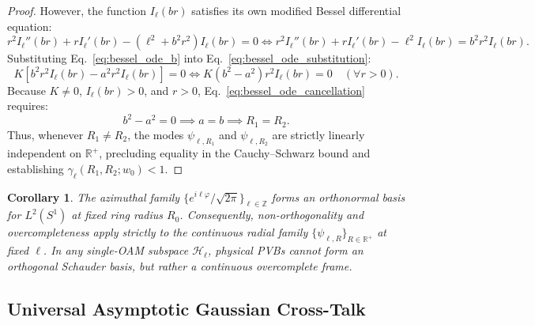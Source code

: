\documentclass[11pt,a4paper]{article}
\newtheorem{corollary}{Corollary}
\begin{document}
\begin{proof}
However, the function $I_\ell(b r)$ satisfies its own modified Bessel differential equation:
\begin{equation}
r^2 I_\ell''(b r) + r I_\ell'(b r) - (\ell^2 + b^2 r^2) I_\ell(b r) = 0 \iff r^2 I_\ell''(b r) + r I_\ell'(b r) - \ell^2 I_\ell(b r) = b^2 r^2 I_\ell(b r).
\label{eq:bessel_ode_b}
\end{equation}
Substituting Eq.~\eqref{eq:bessel_ode_b} into Eq.~\eqref{eq:bessel_ode_substitution}:
\begin{equation}
K \left[ b^2 r^2 I_\ell(b r) - a^2 r^2 I_\ell(b r) \right] = 0 \iff K (b^2 - a^2) r^2 I_\ell(b r) = 0 \quad (\forall r > 0).
\label{eq:bessel_ode_cancellation}
\end{equation}
Because $K \neq 0$, $I_\ell(b r) > 0$, and $r > 0$, Eq.~\eqref{eq:bessel_ode_cancellation} requires:
\begin{equation}
b^2 - a^2 = 0 \implies a = b \implies R_1 = R_2.
\label{eq:ode_conclusion}
\end{equation}
Thus, whenever $R_1 \neq R_2$, the modes $\psi_{\ell, R_1}$ and $\psi_{\ell, R_2}$ are strictly linearly independent on $\mathbb{R}^+$, precluding equality in the Cauchy--Schwarz bound and establishing $\gamma_\ell(R_1, R_2; w_0) < 1$.
\end{proof}

\begin{corollary}
The azimuthal family $\{e^{i\ell\varphi}/\sqrt{2\pi}\}_{\ell \in \mathbb{Z}}$ forms an orthonormal basis for $L^2(S^1)$ at fixed ring radius $R_0$. Consequently, non-orthogonality and overcompleteness apply strictly to the continuous radial family $\{\psi_{\ell, R}\}_{R \in \mathbb{R}^+}$ at fixed $\ell$. In any single-OAM subspace $\mathcal{H}_\ell$, physical PVBs cannot form an orthogonal Schauder basis, but rather a continuous overcomplete frame.
\end{corollary}

\subsection{Universal Asymptotic Gaussian Cross-Talk}
\end{document}
